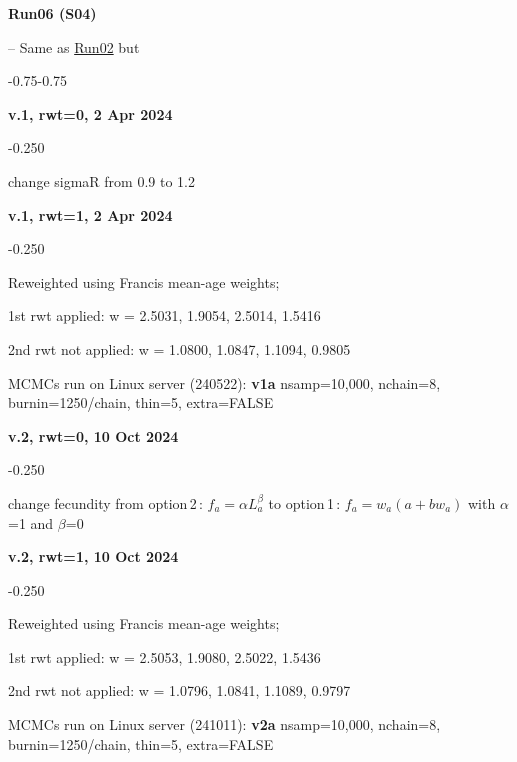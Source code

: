 \hypertarget{R06}{\textbf{Run06 (S04)}} -- Same as \hyperlink{R02}{Run02} but
\begin{itemize_csas}{-0.75}{-0.75}
	\item \textbf{v.1, rwt=0, 2 Apr 2024}
	\begin{itemize_csas}{-0.25}{0}
		\item change sigmaR from 0.9 to 1.2
	\end{itemize_csas}
	\item \textbf{v.1, rwt=1, 2 Apr 2024}
	\begin{itemize_csas}{-0.25}{0}
		\item Reweighted using Francis mean-age weights;
		\item 1st rwt applied: w = 2.5031, 1.9054, 2.5014, 1.5416
		\item 2nd rwt not applied: w = 1.0800, 1.0847, 1.1094, 0.9805
		\item MCMCs run on Linux server (240522): \textbf{v1a} nsamp=10,000, nchain=8, burnin=1250/chain, thin=5, extra=FALSE
	\end{itemize_csas}
	\item \textbf{v.2, rwt=0, 10 Oct 2024}
	\begin{itemize_csas}{-0.25}{0}
		\item change fecundity from option\,2\,: $f_a = \alpha L_a^{\beta}$ to option\,1\,:  $f_a = w_a (a + b w_a)$ with $\alpha$=1 and $\beta$=0
	\end{itemize_csas}
	\item \textbf{v.2, rwt=1, 10 Oct 2024}
	\begin{itemize_csas}{-0.25}{0}
		\item Reweighted using Francis mean-age weights;
		\item 1st rwt applied: w = 2.5053, 1.9080, 2.5022, 1.5436
		\item 2nd rwt not applied: w = 1.0796, 1.0841, 1.1089, 0.9797
		\item MCMCs run on Linux server (241011): \textbf{v2a} nsamp=10,000, nchain=8, burnin=1250/chain, thin=5, extra=FALSE
	\end{itemize_csas}
\end{itemize_csas}

